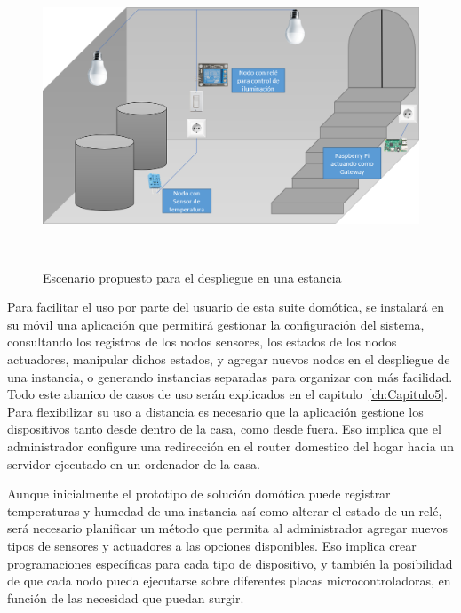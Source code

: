 \vspace{0.5cm}
\begin{figure}[hbt!]
\label{scenary_proposal}
\centering
\includegraphics[height=3.5in]{figures/escenario_propuesto_comentado.png}
\caption[Escenario propuesto para el despliegue en una estancia]{Escenario propuesto para el despliegue en una estancia}
\end{figure}

\vspace{1cm}

Para facilitar el uso por parte del usuario de esta suite domótica, se instalará en su móvil una aplicación que permitirá gestionar la configuración del sistema, consultando los registros de los nodos sensores, los estados de los nodos actuadores, manipular dichos estados, y agregar nuevos nodos en el despliegue de una instancia, o generando instancias separadas para organizar con más facilidad. Todo este abanico de casos de uso serán explicados en el capitulo~\ref{ch:Capitulo5}. Para flexibilizar su uso a distancia es necesario que la aplicación gestione los dispositivos tanto desde dentro de la casa, como desde fuera. Eso implica que el administrador configure una redirección en el router domestico del hogar hacia un servidor ejecutado en un ordenador de la casa.

\vspace{1cm}

Aunque inicialmente el prototipo de solución domótica puede registrar temperaturas y humedad de una instancia así como alterar el estado de un relé, será necesario planificar un método que permita al administrador agregar nuevos tipos de sensores y actuadores a las opciones disponibles. Eso implica crear programaciones específicas para cada tipo de dispositivo, y también la posibilidad de que cada nodo pueda ejecutarse sobre diferentes placas microcontroladoras, en función de las necesidad que puedan surgir.


